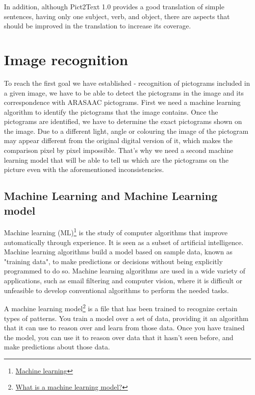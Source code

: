 In addition, although Pict2Text 1.0 provides a good translation of simple sentences, having only one subject, verb, and object, there are aspects that should be improved in the translation to increase its coverage.

\section{Image recognition}

To reach the first goal we have established - recognition of pictograms included in a given image, we have to be able to detect the pictograms in the image and its correspondence with ARASAAC pictograms. First we need a machine learning algorithm to identify the pictograms that the image contains. Once the pictograms are identified, we have to determine the exact pictograms shown on the image. Due to a different light, angle or colouring the image of the pictogram may appear different from the original digital version of it, which makes the comparison pixel by pixel impossible. That's why we need a second machine learning model that will be able to tell us which are the pictograms on the picture even with the aforementioned inconsistencies.

\subsection{Machine Learning and Machine Learning model}
Machine learning (ML)\footnote{\href{https://en.wikipedia.org/wiki/Machine_learning}{Machine learning}} is the study of computer algorithms that improve automatically through experience. It is seen as a subset of artificial intelligence. Machine learning algorithms build a model based on sample data, known as "training data", to make predictions or decisions without being explicitly programmed to do so. Machine learning algorithms are used in a wide variety of applications, such as email filtering and computer vision, where it is difficult or unfeasible to develop conventional algorithms to perform the needed tasks.

A machine learning model\footnote{\href{https://docs.microsoft.com/en-us/windows/ai/windows-ml/what-is-a-machine-learning-model}{What is a machine learning model?}} is a file that has been trained to recognize certain types of patterns. You train a model over a set of data, providing it an algorithm that it can use to reason over and learn from those data.
Once you have trained the model, you can use it to reason over data that it hasn't seen before, and make predictions about those data.

